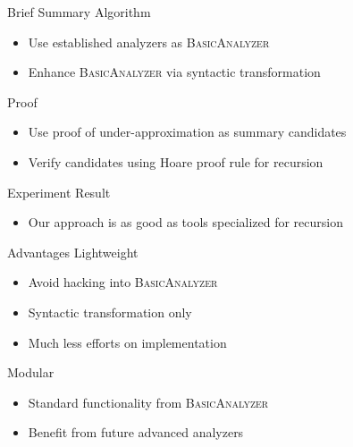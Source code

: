 
\begin{frame}{Brief Summary}
  Algorithm
  \begin{itemize}
    \item Use established analyzers as \textsc{BasicAnalyzer}
    \item Enhance \textsc{BasicAnalyzer} via syntactic transformation
  \end{itemize}
  \vfill
  Proof
  \begin{itemize}
    \item Use proof of under-approximation as summary candidates
    \item Verify candidates using Hoare proof rule for recursion  
  \end{itemize}
  \vfill
  Experiment Result
  \begin{itemize}
    \item Our approach is as good as tools specialized for recursion
  \end{itemize}
\end{frame}

\begin{frame}{Advantages}
  Lightweight
  \begin{itemize}
    \item Avoid hacking into \textsc{BasicAnalyzer}
    \item Syntactic transformation only
    \item Much less efforts on implementation
  \end{itemize}
  \vfill
  Modular
  \begin{itemize}
    \item Standard functionality from \textsc{BasicAnalyzer}
    \item Benefit from future advanced analyzers
  \end{itemize}
\end{frame}


